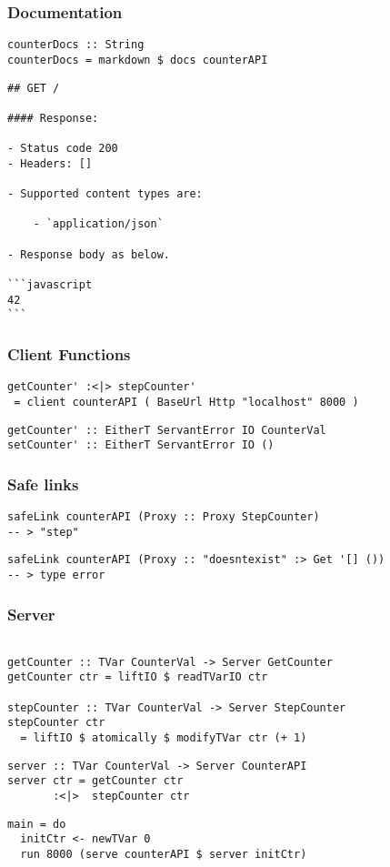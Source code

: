 \documentclass{beamer}
\begin{document}
\begin{frame}[fragile]
\frametitle{Documentation}
\pause
\begin{verbatim}
counterDocs :: String
counterDocs = markdown $ docs counterAPI
\end{verbatim}
\end{frame}

\begin{frame}[fragile]
\begin{verbatim}
## GET /

#### Response:

- Status code 200
- Headers: []

- Supported content types are:

    - `application/json`

- Response body as below.

```javascript
42
```
\end{verbatim}
\end{frame}

\begin{frame}[fragile]
\frametitle{Client Functions}
\pause
\begin{verbatim}
getCounter' :<|> stepCounter'
 = client counterAPI ( BaseUrl Http "localhost" 8000 )
\end{verbatim}
\pause
\begin{verbatim}
getCounter' :: EitherT ServantError IO CounterVal
setCounter' :: EitherT ServantError IO ()
\end{verbatim}
\end{frame}

\begin{frame}[fragile]
\frametitle{Safe links}
\pause
\begin{verbatim}
safeLink counterAPI (Proxy :: Proxy StepCounter)
-- > "step"
\end{verbatim}
\pause
\begin{verbatim}
safeLink counterAPI (Proxy :: "doesntexist" :> Get '[] ())
-- > type error
\end{verbatim}
\end{frame}

\begin{frame}[fragile]
\frametitle{Server}
\begin{verbatim}

getCounter :: TVar CounterVal -> Server GetCounter
getCounter ctr = liftIO $ readTVarIO ctr

stepCounter :: TVar CounterVal -> Server StepCounter
stepCounter ctr
  = liftIO $ atomically $ modifyTVar ctr (+ 1)
\end{verbatim}
\pause
\begin{verbatim}
server :: TVar CounterVal -> Server CounterAPI
server ctr = getCounter ctr
       :<|>  stepCounter ctr
\end{verbatim}
\pause
\begin{verbatim}
main = do
  initCtr <- newTVar 0
  run 8000 (serve counterAPI $ server initCtr)
\end{verbatim}
\end{frame}
\end{document}
